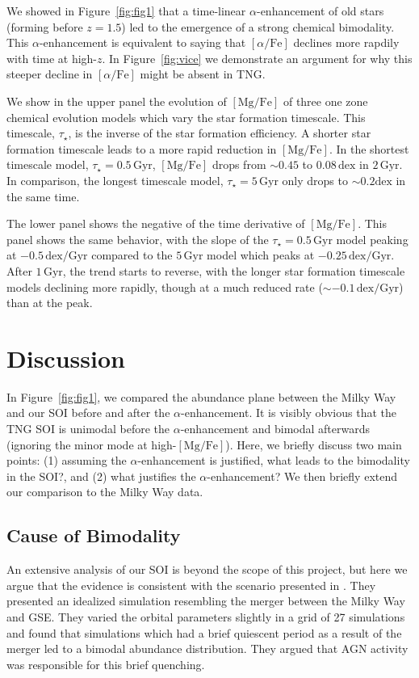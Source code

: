 \documentclass[linenumbers, twocolumn]{aastex631}
\newcommand{\Gyr}{\ensuremath{\textrm{Gyr}}}
\newcommand{\MgFe}{\ensuremath{[\textrm{Mg}/\textrm{Fe}]}}
\newcommand{\alphaFe}{\ensuremath{[\alpha/\textrm{Fe}]}}
\newcommand{\dex}{\ensuremath{\textrm{dex}}}
\begin{document}
We showed in Figure~\ref{fig:fig1} that a time-linear $\alpha$-enhancement of old stars (forming before $z=1.5$) led to the emergence of a strong chemical bimodality. This $\alpha$-enhancement is equivalent to saying that \alphaFe{} declines more rapdily with time at high-$z$. In Figure~\ref{fig:vice} we demonstrate an argument for why this steeper decline in \alphaFe{} might be absent in TNG.

We show in the upper panel the evolution of \MgFe{} of three one zone chemical evolution models which vary the star formation timescale. This timescale, $\tau_{\star}$, is the inverse of the star formation efficiency. A shorter star formation timescale leads to a more rapid reduction in \MgFe{}. In the shortest timescale model, $\tau_{\star}=0.5\,\Gyr$, \MgFe{} drops from $\sim0.45$ to $0.08\,\dex$ in $2\,\Gyr$. In comparison, the longest timescale model, $\tau_{\star}=5\,\Gyr$ only drops to $\sim0.2\dex$ in the same time.

The lower panel shows the negative of the time derivative of \MgFe{}. This panel shows the same behavior, with the slope of the $\tau_{\star}=0.5\,\Gyr$ model peaking at $-0.5\,\dex/\Gyr$ compared to the $5\,\Gyr$ model which peaks at $-0.25\,\dex/\Gyr$. After $1\,\Gyr$, the trend starts to reverse, with the longer star formation timescale models declining more rapidly, though at a much reduced rate ($\sim-0.1\,\dex/\Gyr$) than at the peak.

\section{Discussion}\label{sec:disc}
In Figure~\ref{fig:fig1}, we compared the abundance plane between the Milky Way and our SOI before and after the $\alpha$-enhancement. It is visibly obvious that the TNG SOI is unimodal before the $\alpha$-enhancement and bimodal afterwards (ignoring the minor mode at high-\MgFe{}). Here, we briefly discuss two main points: (1) assuming the $\alpha$-enhancement is justified, what leads to the bimodality in the SOI?, and (2) what justifies the $\alpha$-enhancement? We then briefly extend our comparison to the Milky Way data.

\subsection{Cause of Bimodality}\label{ssec:bim_cause}
An extensive analysis of our SOI is beyond the scope of this project, but here we argue that the evidence is consistent with the scenario presented in \citet{2024arXiv240707985B}. They presented an idealized simulation resembling the merger between the Milky Way and GSE. They varied the orbital parameters slightly in a grid of 27 simulations and found that simulations which had a brief quiescent period as a result of the merger led to a bimodal abundance distribution. They argued that AGN activity was responsible for this brief quenching.
\end{document}
